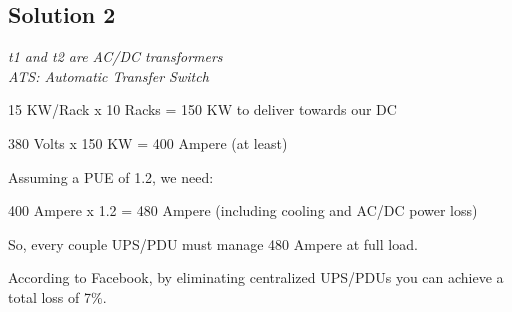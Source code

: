 \hypertarget{solution-2-1}{%
\subsection{Solution 2}\label{solution-2-1}}
\begin{paracol}{2}
  \colfill
  \emph{t1 and t2 are AC/DC transformers}\\
  \emph{ATS: Automatic Transfer Switch}
  
  15 KW/Rack x 10 Racks = 150 KW to deliver towards our DC
  
  380 Volts x 150 KW = 400 Ampere (at least)
  
  Assuming a PUE of 1.2, we need:
  
  400 Ampere x 1.2 = 480 Ampere (including cooling and AC/DC power loss)
  
  So, every couple UPS/PDU must manage 480 Ampere at full load.
  
  According to Facebook, by eliminating centralized UPS/PDUs you can
  achieve a total loss of 7\%.
  \colfill
  \switchcolumn


\end{paracol}
